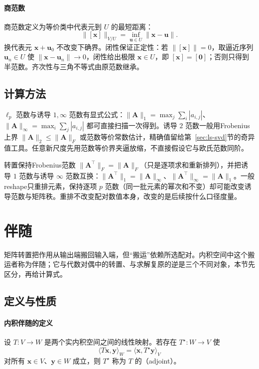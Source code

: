 \paragraph{商范数}

商范数定义为等价类中代表元到 $U$ 的最短距离：
\[
 \lVert[\bm x]\rVert_{V/U}=\inf_{\bm u\in U}\lVert\bm x-\bm u\rVert.
\]
换代表元 $\bm x+\bm u_0$ 不改变下确界。闭性保证正定性：若 $\lVert[\bm x]\rVert=0$，取逼近序列 $\bm u_n\in U$ 使 $\lVert\bm x-\bm u_n\rVert\to0$，闭性给出极限 $\bm x\in U$，即 $[\bm x]=[\bm0]$；否则只得到半范数。齐次性与三角不等式由原范数继承。

\subsection{计算方法}

$\ell_p$ 范数与诱导 $1,\infty$ 范数有显式公式：$\|\bm A\|_1=\max_j\sum_i|a_{i,j}|$、$\|\bm A\|_\infty=\max_i\sum_j|a_{i,j}|$ 都可直接扫描一次得到。诱导 $2$ 范数一般用Frobenius上界 $\|\bm A\|_2\leq\|\bm A\|_F$ 或范数等价常数估计，精确值留给第~\ref{sec:ls-svd}节的奇异值工具。任意新尺度先用范数等价界夹逼放缩，不直接假设它与欧氏范数同阶。

转置保持Frobenius范数 $\|\bm A^\top\|_F=\|\bm A\|_F$（只是逐项求和重新排列），并把诱导 $1$ 范数与诱导 $\infty$ 范数互换：$\|\bm A^\top\|_1=\|\bm A\|_\infty$、$\|\bm A^\top\|_\infty=\|\bm A\|_1$。一般reshape只重排元素，保持逐项 $p$ 范数（同一批元素的幂次和不变）却可能改变诱导范数与矩阵秩。重排不改变配对数值本身，改变的是后续按什么口径度量。

\section{伴随}
\label{sec:ls-adjoints}

矩阵转置把作用从输出端搬回输入端，但“搬运”依赖所选配对。内积空间中这个搬运者称为伴随；它与代数对偶中的转置、与求解复原的逆是三个不同对象，本节先区分，再给计算式。

\subsection{定义与性质}

\paragraph{内积伴随的定义}

设 $T:V\to W$ 是两个实内积空间之间的线性映射。若存在 $T^\star:W\to V$ 使
\begin{equation}
 \langle T\bm x,\bm y\rangle_W=\langle\bm x,T^\star\bm y\rangle_V
 \label{eq:ls-adjoint-pairing}
\end{equation}
对所有 $\bm x\in V$、$\bm y\in W$ 成立，则 $T^\star$ 称为 $T$ 的（adjoint）。
\label{def:linear-algebra-adjoint}

